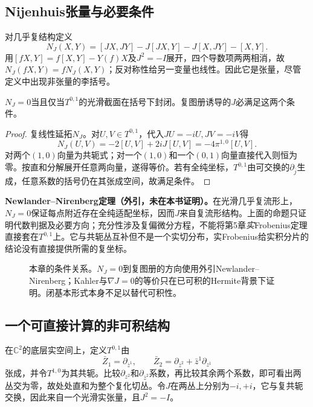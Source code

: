 \subsection{Nijenhuis张量与必要条件}
对几乎复结构定义
\begin{equation}\label{eq:nijenhuis}
 N_J(X,Y)=[JX,JY]-J[JX,Y]-J[X,JY]-[X,Y].
\end{equation}
用$[fX,Y]=f[X,Y]-Y(f)X$及$J^2=-I$展开，四个导数项两两相消，故$N_J(fX,Y)=fN_J(X,Y)$；反对称性给另一变量也线性。因此它是张量，尽管定义中出现非张量的李括号。

\begin{proposition}\label{prop:nijenhuis-involutive}
$N_J=0$当且仅当$T^{0,1}$的光滑截面在括号下封闭。复图册诱导的$J$必满足这两个条件。
\end{proposition}
\begin{proof}
复线性延拓$N_J$。对$U,V\in T^{0,1}$，代入$JU=-iU,JV=-iV$得
\[
 N_J(U,V)=-2[U,V]+2iJ[U,V]=-4\pi^{1,0}[U,V].
\]
对两个$(1,0)$向量为共轭式；对一个$(1,0)$和一个$(0,1)$向量直接代入则恒为零。按直和分解展开任意两向量，遂得等价。若有全纯坐标，$T^{0,1}$由可交换的$\partial_{\bar j}$生成，任意系数的括号仍在其张成空间，故满足条件。
\end{proof}

\textbf{Newlander--Nirenberg定理（外引，未在本书证明）。}在光滑几乎复流形上，$N_J=0$保证每点附近存在全纯适配坐标，因而$J$来自复流形结构。上面的命题只证明代数判据及必要方向；充分性涉及复偏微分方程，不能将第5章\emph{实}Frobenius定理直接套在$T^{0,1}$上。它与共轭丛互补但不是一个实切分布，实Frobenius给实积分片的结论没有直接提供所需的复坐标。

\begin{figure}[htbp]
\centering
\caption{本章的条件关系。$N_J=0$到复图册的方向使用外引Newlander--Nirenberg；Kahler与$\nabla J=0$的等价只在已可积的Hermite背景下证明。闭基本形式本身不足以替代可积性。}
\label{fig:complex-conditions}
\end{figure}

\subsection{一个可直接计算的非可积结构}
在$\mathbb C^2$的底层实空间上，定义$T^{0,1}$由
\[
 \bar Z_1=\partial_{\bar z^1},\qquad
 \bar Z_2=\partial_{\bar z^2}+\bar z^1\partial_{z^1}
\]
张成，并令$T^{1,0}$为其共轭。比较$\partial_{z^2}$和$\partial_{\bar z^2}$系数，再比较其余两个系数，即可看出两丛交为零，故处处直和为整个复化切丛。令$J$在两丛上分别为$-i,+i$，它与复共轭交换，因此来自一个光滑实张量，且$J^2=-I$。


